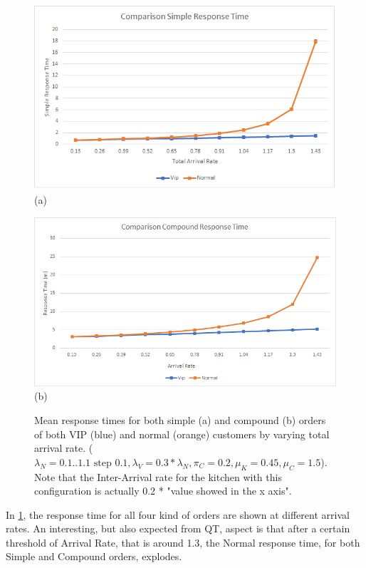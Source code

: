\begin{figure}[H]
  \begin{minipage}{0.48\textwidth}
    \centering
    \includegraphics[width=\textwidth]{figs/workloadSimple.png}
    (a)
  \end{minipage}\hspace{0.03\textwidth}
  \begin{minipage}{0.48\textwidth}
    \centering
    \includegraphics[width=\textwidth]{figs/workloadCompound.png}
    (b)
  \end{minipage}
  \caption{Mean response times for both simple (a) and compound (b) orders of both VIP (blue) and normal (orange) customers by varying total arrival rate. ($\lambda_N={{0.1..1.1 \text{ step } 0.1}},\lambda_V=0.3*\lambda_N,\pi_C=0.2, \mu_K=0.45, \mu_C=1.5$). Note that the Inter-Arrival rate for the kitchen with this configuration is actually 0.2 * "value showed in the x axis".}
  \label{fig:workload}
\end{figure}

In \cref{fig:workload}, the response time for all four kind of orders are shown at different arrival rates.
An interesting, but also expected from QT, aspect is that after a certain threshold of Arrival Rate, that is around 1.3, the Normal response time, for both Simple and Compound orders, explodes.

